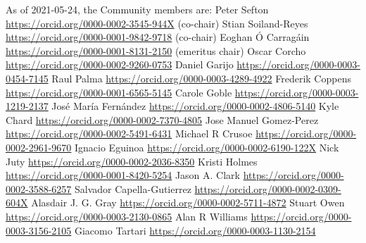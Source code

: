 \markdownRendererInterblockSeparator
{}As of 2021-05-24, the  Community members are:\markdownRendererInterblockSeparator
{}\markdownRendererUlBeginTight
\markdownRendererUlItem Peter Sefton \url{https://orcid.org/0000-0002-3545-944X} (co-chair)\markdownRendererUlItemEnd 
\markdownRendererUlItem Stian Soiland-Reyes \url{https://orcid.org/0000-0001-9842-9718} (co-chair)\markdownRendererUlItemEnd 
\markdownRendererUlItem Eoghan Ó Carragáin \url{https://orcid.org/0000-0001-8131-2150} (emeritus chair)\markdownRendererUlItemEnd 
\markdownRendererUlItem Oscar Corcho \url{https://orcid.org/0000-0002-9260-0753}\markdownRendererUlItemEnd 
\markdownRendererUlItem Daniel Garijo \url{https://orcid.org/0000-0003-0454-7145}\markdownRendererUlItemEnd 
\markdownRendererUlItem Raul Palma \url{https://orcid.org/0000-0003-4289-4922}\markdownRendererUlItemEnd 
\markdownRendererUlItem Frederik Coppens \url{https://orcid.org/0000-0001-6565-5145}\markdownRendererUlItemEnd 
\markdownRendererUlItem Carole Goble \url{https://orcid.org/0000-0003-1219-2137}\markdownRendererUlItemEnd 
\markdownRendererUlItem José María Fernández \url{https://orcid.org/0000-0002-4806-5140}\markdownRendererUlItemEnd 
\markdownRendererUlItem Kyle Chard \url{https://orcid.org/0000-0002-7370-4805}\markdownRendererUlItemEnd 
\markdownRendererUlItem Jose Manuel Gomez-Perez \url{https://orcid.org/0000-0002-5491-6431}\markdownRendererUlItemEnd 
\markdownRendererUlItem Michael R Crusoe \url{https://orcid.org/0000-0002-2961-9670}\markdownRendererUlItemEnd 
\markdownRendererUlItem Ignacio Eguinoa \url{https://orcid.org/0000-0002-6190-122X}\markdownRendererUlItemEnd 
\markdownRendererUlItem Nick Juty \url{https://orcid.org/0000-0002-2036-8350}\markdownRendererUlItemEnd 
\markdownRendererUlItem Kristi Holmes \url{https://orcid.org/0000-0001-8420-5254}\markdownRendererUlItemEnd 
\markdownRendererUlItem Jason A. Clark \url{https://orcid.org/0000-0002-3588-6257}\markdownRendererUlItemEnd 
\markdownRendererUlItem Salvador Capella-Gutierrez \url{https://orcid.org/0000-0002-0309-604X}\markdownRendererUlItemEnd 
\markdownRendererUlItem Alasdair J. G. Gray \url{https://orcid.org/0000-0002-5711-4872}\markdownRendererUlItemEnd 
\markdownRendererUlItem Stuart Owen \url{https://orcid.org/0000-0003-2130-0865}\markdownRendererUlItemEnd 
\markdownRendererUlItem Alan R Williams \url{https://orcid.org/0000-0003-3156-2105}\markdownRendererUlItemEnd 
\markdownRendererUlItem Giacomo Tartari \url{https://orcid.org/0000-0003-1130-2154}\markdownRendererUlItemEnd 
